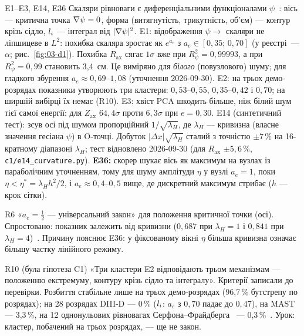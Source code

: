 \begin{established}{E1--E3, E14, E36}
Скаляри рівноваги є диференціальними функціоналами $\psi$~\cite{ProjRegisters,ProjDeepDives}: вісь --- критична точка $\nabla\psi=0$, форма (витягнутість, трикутність, об'єм) --- контур крізь сідло, $l_{i}$ --- інтеграл від $|\nabla\psi|^2$. E1: відображення $\psi\to$ скаляри не ліпшицеве в $L^2$: похибка скаляра зростає як $e^{a_e}$ з $a_e\in[0{,}35;\,0{,}70]$ (у реєстрі~--- $\alpha$; рис.~\ref{fig:03-d1}). Похибка $R_{\mathrm{ax}}$ сягає $1\sigma$ вже при $R^2_\psi=0{,}99993$, а при $R^2_\psi=0{,}99$ становить 3,4~см. Це виміряно для \emph{білого} (повузлового) шуму; для гладкого збурення $a_e\approx0{,}69$--$1{,}08$ (уточнення 2026-09-30). E2: на трьох демо-розрядах показники утворюють три кластери: $0{,}53$--$0{,}55$, $0{,}35$--$0{,}42$ і $0{,}70$; на ширшій вибірці їх немає (R10). E3: хвіст PCA шкодить більше, ніж білий шум тієї самої енергії: для $Z_{\mathrm{ax}}$ $64{,}4\sigma$ проти $6{,}3\sigma$ при $e=0{,}30$. E14 (синтетичний тест): зсув осі під шумом пропорційний $1/\sqrt{\lambda_H}$, де $\lambda_H$ --- кривизна (власне значення гесіана $\psi$) в O-точці. Добуток $|\Delta x|\sqrt{\lambda_H}$ сталий з точністю $\pm7\,\%$ на 16-кратному діапазоні $\lambda_H$; тест відновлено 2026-09-30 (для $R_{\mathrm{ax}}$ $\pm5{,}6\,\%$, \texttt{c1/e14\_curvature.py}). \textbf{E36:} скорер шукає вісь як максимум на вузлах із параболічним уточненням, тому для шуму амплітуди $\eta$ у вузлі $a_e=1$, поки $\eta<\eta^{*}=\lambda_H h^2/2$, і $a_e\approx0{,}4$--$0{,}5$ вище, де дискретний максимум стрибає ($h$ --- крок сітки).
\end{established}
\begin{refuted}{R6}
«$a_e=\tfrac12$ --- універсальний закон» для положення критичної точки (осі). Спростовано: показник залежить від кривизни ($0{,}687$ при $\lambda_H=1$ і $0{,}841$ при $\lambda_H=4$)~\cite{ProjRegisters}. Причину пояснює E36: у фіксованому вікні $\eta$ більша кривизна означає більшу частку лінійного режиму.
\end{refuted}

\begin{refuted}{R10 (була гіпотеза C1)}
«Три кластери E2 відповідають трьом механізмам --- положенню екстремуму, контуру крізь сідло та інтегралу». Критерії записали до перевірки. Розбиття стабільне лише на трьох демо-розрядах (96,7\,\% бутстрепу по розрядах); на 28 розрядах DIII-D --- 0\,\% ($l_{i}$: $a_e$ з $0{,}70$ падає до $0{,}47$), на MAST --- 3,3\,\%, на 12 однонульових рівновагах Серфона--Фрайдберга~\cite{Cerfon2010} --- 0,3\,\%~\cite{ProjRegisters,ProjGuide}. Урок: кластер, побачений на трьох розрядах, --- ще не закон.
\end{refuted}

